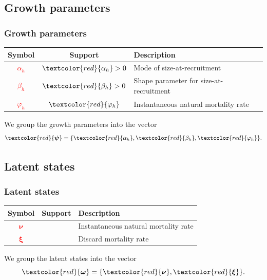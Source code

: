 \documentclass{beamer}
\begin{document}
\subsection{Growth parameters}
\begin{frame}
\frametitle{Growth parameters}
\begin{table}
  \centering
  \begin{tabular}{ccl}
  \hline
  Symbol & Support & Description \\
  \hline
      \textcolor{red}{$\alpha_h$} & $\textcolor{red}{\alpha_h} > 0$ & Mode of size-at-recruitment\\
      \textcolor{red}{$\beta_h$} & $\textcolor{red}{\beta_h} > 0$ & Shape parameter for size-at-recruitment\\
      \textcolor{red}{$\varphi_h$} & $\textcolor{red}{\varphi_h}$ & Instantaneous natural mortality rate\\
  \hline
  \end{tabular}
\end{table}
We group the growth parameters into the vector
\begin{equation*}
  \textcolor{red}{\boldsymbol\psi} = \{ \textcolor{red}{\alpha_h}, 
  \textcolor{red}{\beta_h}, \textcolor{red}{\varphi_h} \}.
\end{equation*}
\end{frame}


\subsection{Latent states}
\begin{frame}
\frametitle{Latent states}
\begin{table}
  \centering
  \begin{tabular}{ccl}
  \hline
  Symbol & Support & Description \\
  \hline
      \textcolor{red}{$\boldsymbol\nu$} & & Instantaneous natural mortality rate\\
      \textcolor{red}{$\boldsymbol\xi$} & &  Discard mortality rate\\
  \hline
  \end{tabular}
\end{table}
We group the latent states into the vector
\begin{equation*}
  \textcolor{red}{\boldsymbol\omega} = \{ \textcolor{red}{\boldsymbol\nu},
  \textcolor{red}{\boldsymbol\xi} \}.
\end{equation*}
\end{frame}
\end{document}
